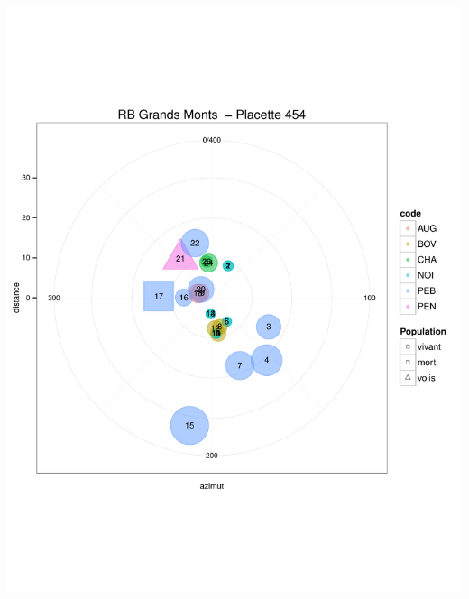 \documentclass[a4paper]{book}\usepackage[]{graphicx}\usepackage[]{color}
\makeatletter
\def\maxwidth{ %
  \ifdim\Gin@nat@width>\linewidth
    \linewidth
  \else
    \Gin@nat@width
  \fi
}
\newenvironment{knitrout}{}{} %
\makeatother
\begin{document}
\begin{knitrout}
{\centering \includegraphics[width=\maxwidth]{Figures/PlanArbres-48} 

}





\end{knitrout}
\end{document}
